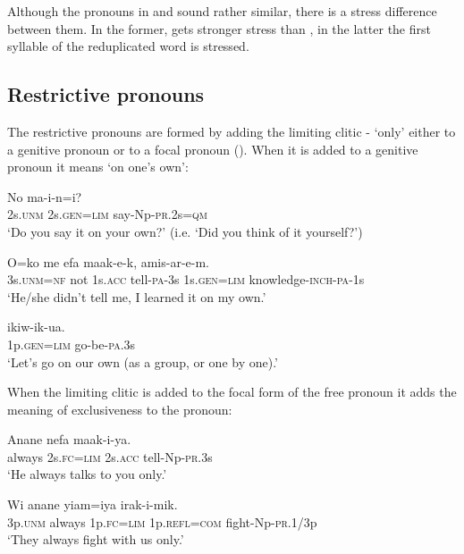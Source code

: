 Although the pronouns in  and  sound rather similar, there is a stress difference between them. In the former,  gets stronger stress than , in the latter the first syllable of the reduplicated word is stressed.

\subsection{Restrictive pronouns}\label{sec:3.5.7}
{}
The restrictive pronouns are formed by adding the limiting clitic - `only' either to a genitive pronoun or to a focal pronoun (). When it is added to a genitive pronoun it means `on one's own':

\ea%
\label{ex:3:x605}
\gll No  ma-i-n=i? \\
2s.\textsc{unm} 2s.\textsc{gen}=\textsc{lim} say-Np-\textsc{pr}.2s=\textsc{qm}\\
\glt`Do you say it on your own?' (i.e. `Did you think of it yourself?')
\z

\ea%
\label{ex:3:x606}
\gll O=ko me efa maak-e-k,  amis-ar-e-m.\\
3s.\textsc{unm}=\textsc{nf} not 1s.\textsc{acc} tell-\textsc{pa}-3s 1s.\textsc{gen}=\textsc{lim} knowledge-\textsc{inch}-\textsc{pa}-1s\\
\glt`He/she didn't tell me, I learned it on my own.'
\z

\ea%
\label{ex:3:x607}
\gll {} ikiw-ik-ua. \\
1p.\textsc{gen}=\textsc{lim} go-be-\textsc{pa}.3s\\
\glt`Let's go on our own (as a group, or one by one).'
\z

When the limiting clitic is added to the focal form of the free pronoun it adds the meaning of exclusiveness to the pronoun:

\ea%
\label{ex:3:x608}
\gll Anane  nefa maak-i-ya. \\
always 2s.\textsc{fc}=\textsc{lim} 2s.\textsc{acc} tell-Np-\textsc{pr}.3s\\
\glt`He always talks to you only.'
\z

\ea%
\label{ex:3:x609}
\gll Wi anane  yiam=iya irak-i-mik. \\
3p.\textsc{unm} always 1p.\textsc{fc}=\textsc{lim} 1p.\textsc{refl}=\textsc{com} fight-Np-\textsc{pr}.1/3p\\
\glt`They always fight with us only.'
\z

